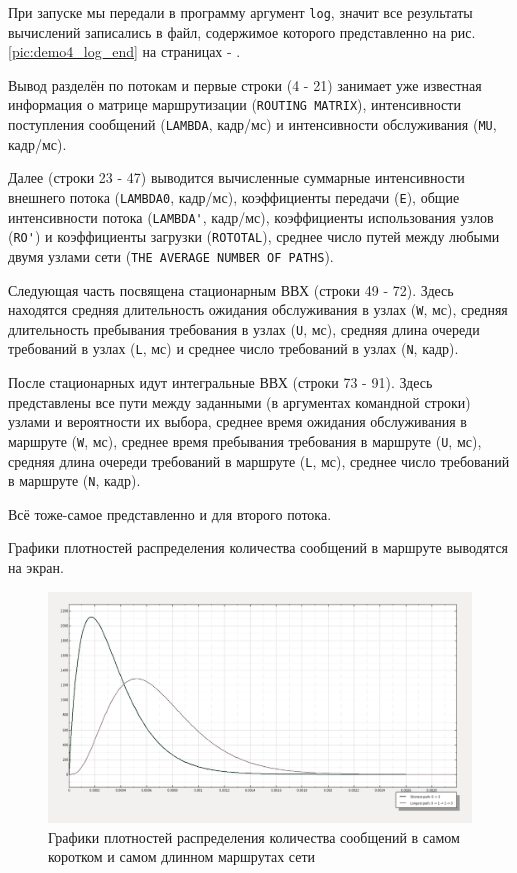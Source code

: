 \documentclass[oneside, draft, 14pt, a4paper]{extreport}
\begin{document}
При запуске мы передали в программу аргумент \verb:log:, значит все результаты вычислений записались в файл, содержимое которого представленно на рис. \ref{pic:demo4_log_end} на страницах \pageref{pic:demo4_log_begin} - \pageref{pic:demo4_log_end}.

Вывод разделён по потокам и первые строки (4 - 21) занимает уже известная информация о матрице маршрутизации (\verb:ROUTING MATRIX:), интенсивности поступления сообщений (\verb:LAMBDA:, кадр/мс) и интенсивности обслуживания (\verb:MU:, кадр/мс).

Далее (строки 23 - 47) выводится вычисленные суммарные интенсивности внешнего потока (\verb:LAMBDA0:, кадр/мс), коэффициенты передачи (\verb:E:), общие интенсивности потока (\verb:LAMBDA':, кадр/мс), коэффициенты использования узлов (\verb:RO':) и коэффициенты загрузки (\verb:ROTOTAL:), среднее число путей между любыми двумя узлами сети  (\verb:THE AVERAGE NUMBER OF PATHS:).

Следующая часть посвящена стационарным ВВХ (строки 49 - 72). Здесь находятся средняя длительность ожидания обслуживания в узлах (\verb:W:, мс), средняя длительность пребывания требования в узлах (\verb:U:, мс), средняя длина очереди требований в узлах (\verb:L:, мс) и среднее число требований в узлах (\verb:N:, кадр).

После стационарных идут интегральные ВВХ (строки 73 - 91). Здесь представлены все пути между заданными (в аргументах командной строки) узлами и вероятности их выбора, среднее время ожидания обслуживания в маршруте (\verb:W:, мс), среднее время пребывания требования в маршруте (\verb:U:, мс), средняя длина очереди требований в маршруте (\verb:L:, мс), среднее число требований в маршруте (\verb:N:, кадр).

Всё тоже-самое представленно и для второго потока.

Графики плотностей распределения количества сообщений в маршруте выводятся на экран.

\begin{figure}[h!]
	\centering
	\includegraphics[width=\textwidth]{demo4_chart}
	
	\caption{Графики плотностей распределения количества сообщений в самом коротком и самом длинном маршрутах сети}
	\label{pic:demo4_graph}
\end{figure}
\end{document}
